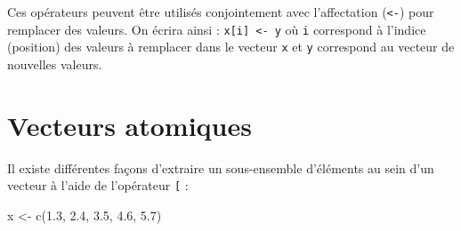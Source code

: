 \documentclass[
  french,
]{scrbook}
\newenvironment{Shaded}{\begin{snugshade}}{\end{snugshade}}
\newcommand{\FloatTok}[1]{\textcolor[rgb]{0.00,0.00,0.81}{#1}}
\newcommand{\FunctionTok}[1]{\textcolor[rgb]{0.00,0.00,0.00}{#1}}
\newcommand{\NormalTok}[1]{#1}
\newcommand{\OtherTok}[1]{\textcolor[rgb]{0.56,0.35,0.01}{#1}}
\begin{document}
Ces opérateurs peuvent être utilisés conjointement avec l'affectation (\texttt{\textless{}-}) pour remplacer des valeurs. On écrira ainsi : \texttt{x{[}i{]}\ \textless{}-\ y} où \texttt{i} correspond à l'indice (position) des valeurs à remplacer dans le vecteur \texttt{x} et \texttt{y} correspond au vecteur de nouvelles valeurs.

\hypertarget{subset-atomic}{%
\section{Vecteurs atomiques}\label{subset-atomic}}

Il existe différentes façons d'extraire un sous-ensemble d'éléments au sein d'un vecteur à l'aide de l'opérateur \texttt{{[}} :

\begin{Shaded}
\begin{Highlighting}[]
\NormalTok{x }\OtherTok{\textless{}{-}} \FunctionTok{c}\NormalTok{(}\FloatTok{1.3}\NormalTok{, }\FloatTok{2.4}\NormalTok{, }\FloatTok{3.5}\NormalTok{, }\FloatTok{4.6}\NormalTok{, }\FloatTok{5.7}\NormalTok{)}
\end{Highlighting}
\end{Shaded}
\end{document}
